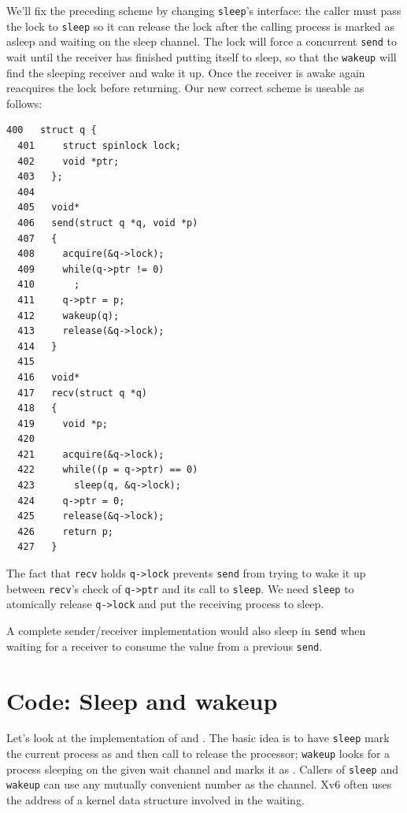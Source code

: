 We'll fix the preceding scheme by changing
\lstinline{sleep}'s
interface:
the caller must pass the lock to
\lstinline{sleep}
so it can release the lock after
the calling process is marked as asleep and waiting on the
sleep channel.
The lock will force a concurrent
\lstinline{send}
to wait until the receiver has finished putting itself to sleep,
so that the
\lstinline{wakeup}
will find the sleeping receiver and wake it up.
Once the receiver is awake again
reacquires the lock before returning.
Our new correct scheme is useable as follows:
\begin{lstlisting}[]
  400	struct q {
  401	  struct spinlock lock;
  402	  void *ptr;
  403	};
  404	
  405	void*
  406	send(struct q *q, void *p)
  407	{
  408	  acquire(&q->lock);
  409	  while(q->ptr != 0)
  410	    ;
  411	  q->ptr = p;
  412	  wakeup(q);
  413	  release(&q->lock);
  414	}
  415	
  416	void*
  417	recv(struct q *q)
  418	{
  419	  void *p;
  420	
  421	  acquire(&q->lock);
  422	  while((p = q->ptr) == 0)
  423	    sleep(q, &q->lock);
  424	  q->ptr = 0;
  425	  release(&q->lock);
  426	  return p;
  427	}
\end{lstlisting}

The fact that
\lstinline{recv}
holds
\lstinline{q->lock}
prevents 
\lstinline{send}
from trying to wake it up between 
\lstinline{recv}'s
check of
\lstinline{q->ptr}
and its call to
\lstinline{sleep}.
We need
\lstinline{sleep}
to atomically release
\lstinline{q->lock}
and put the receiving process to sleep.

A complete sender/receiver implementation would also sleep
in
\lstinline{send}
when waiting for a receiver to consume
the value from a previous
\lstinline{send}.
\section{Code: Sleep and wakeup}

Let's look at the implementation of
and
.
The basic idea is to have
\lstinline{sleep}
mark the current process as
and then call
to release the processor;
\lstinline{wakeup}
looks for a process sleeping on the given wait channel
and marks it as 
.
Callers of
\lstinline{sleep}
and
\lstinline{wakeup}
can use any mutually convenient number as the channel.
Xv6 often uses the address
of a kernel data structure involved in the waiting.


